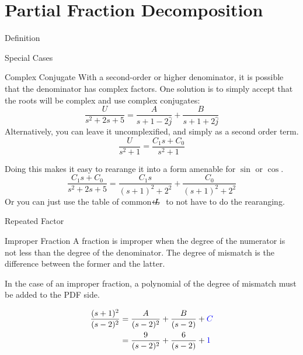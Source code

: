 \documentclass{../templates/topic}
\begin{document}
\chapter{Partial Fraction Decomposition}


\begin{section}{Definition}
\end{section}

\begin{section}{Special Cases}
	\begin{subsection}{Complex Conjugate}
		With a second-order or higher denominator, it is possible that the denominator has complex factors.
		One solution is to simply accept that the roots will be complex and use complex conjugates:
		\begin{equation*}
			\frac{U}{s^2+2s+5}=\frac{A}{s+1-2\hat{j}}+\frac{B}{s+1+2\hat{j}}
		\end{equation*}
		Alternatively, you can leave it uncomplexified, and simply as a second order term.
		\begin{equation*}
			\frac{U}{s^2+1}=\frac{C_1s+C_0}{s^2+1}
		\end{equation*}
		
		Doing this makes it easy to rearange it into a form amenable for $\sin$ or $\cos$.
		\begin{equation*}
			\frac{C_1s+C_0}{s^2+2s+5}=\frac{C_1s}{(s+1)^2+2^2}+\frac{C_0}{(s+1)^2+2^2}
		\end{equation*}
		Or you can just use the table of common $\ilaplace$ to not have to do the rearanging.
	\end{subsection}
	
	\begin{subsection}{Repeated Factor}
	\end{subsection}
	\begin{subsection}{Improper Fraction}
		A fraction is improper when the degree of the numerator is not less than the degree of the denominator. The degree of mismatch is the difference between the former and the latter.
		
		In the case of an improper fraction, a polynomial of the degree of mismatch must be added to the PDF side.
		
		\begin{align*}
			\frac{(s+1)^2}{(s-2)^2} &= \frac{A}{(s-2)^2}+\frac{B}{(s-2)}+\textcolor{blue}{C} \\
			&= \frac{9}{(s-2)^2}+\frac{6}{(s-2)}+\textcolor{blue}{1}
		\end{align*}
		
		
	\end{subsection}
\end{section}
	
\end{document}
